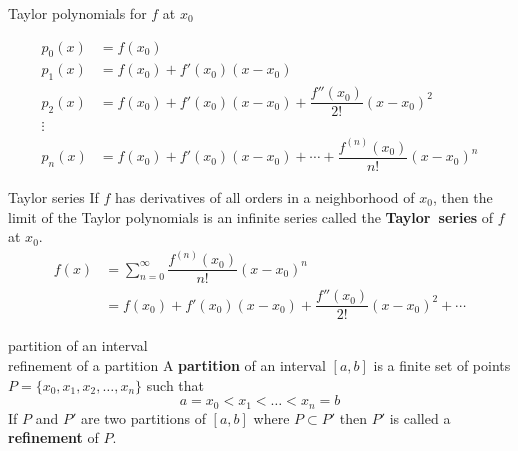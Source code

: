 \documentclass[avery5371,grid]{flashcards}
\begin{document}

\begin{flashcard}[Definition]{Taylor polynomials for $f$ at $x_0$}
\begin{small}
\begin{align*}
p_0(x) &=f(x_0) \\
p_1(x) &=f(x_0) + f'(x_0)(x-x_0)\\
p_2(x) &=f(x_0) + f'(x_0)(x-x_0) + \dfrac{f''(x_0)}{2!}(x-x_0)^2\\
\vdots &\\
p_n(x) &=f(x_0) + f'(x_0)(x-x_0) + \cdots +
\dfrac{f^{(n)}(x_0)}{n!}(x-x_0)^n
\end{align*}
\end{small}
\end{flashcard}

\begin{flashcard}[Definition]{Taylor series}
If $f$ has derivatives of all orders in a neighborhood of $x_0$, then
the limit of the Taylor polynomials is an infinite series called the
\mbox{\textbf{Taylor series}} of $f$ at $x_0$.
\begin{equation*}
\begin{split}
f(x) &= \sum_{n=0}^{\infty} \dfrac{f^{(n)}(x_0)}{n!} (x-x_0)^n \\
     &= f(x_0) + f'(x_0)(x-x_0) + \dfrac{f''(x_0)}{2!}(x-x_0)^2 + \cdots
\end{split}
\end{equation*}
\end{flashcard}


\begin{flashcard}[Definition]{partition of an interval \\
refinement of a partition}
A \textbf{partition} of an interval $[a,b]$ is a finite set of points
$P = \{x_0, x_1, x_2, \ldots , x_n \}$ such that
\begin{equation*}
a = x_0 < x_1 < \ldots < x_n = b
\end{equation*}
If $P$ and $P'$ are two partitions of $[a,b]$ where $P \subset P'$
then $P'$ is called a \mbox{\textbf{refinement}} of $P$.
\end{flashcard}
\end{document}
